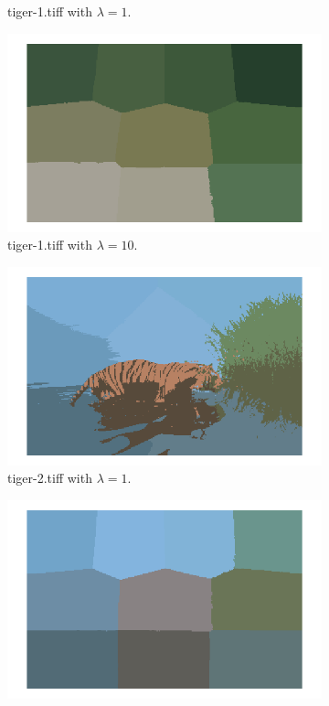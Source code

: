 \documentclass[12pt]{report}
\begin{document}
\begin{enumerate}
\begin{figure}[H]
\begin{subfigure}{0.48\linewidth}
      \caption{tiger-1.tiff with \( \lambda=1\).}
    \end{subfigure}
    \begin{subfigure}{0.48\linewidth}
      \includegraphics[width=\linewidth]{2b10.png}
      \caption{tiger-1.tiff with \( \lambda=10\).}
    \end{subfigure}
    \begin{subfigure}{0.48\linewidth}
      \includegraphics[width=\linewidth]{3b1.png}
      \caption{tiger-2.tiff with \( \lambda=1\).}
    \end{subfigure}
    \begin{subfigure}{0.48\linewidth}
      \includegraphics[width=\linewidth]{3b10.png}

\end{subfigure}
\end{figure}
\end{enumerate}
\end{document}
